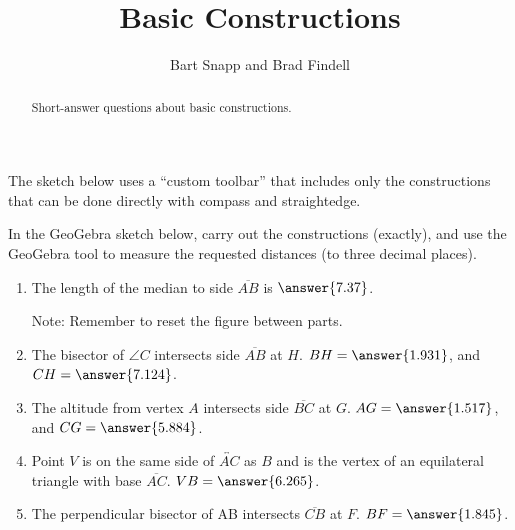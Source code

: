 \documentclass[nooutcomes]{ximera}
\title{Basic Constructions}
\author{Bart Snapp and Brad Findell}
\begin{document}
\begin{abstract}
Short-answer questions about basic constructions. 
\end{abstract}
\maketitle


\begin{warning}
The sketch below uses a ``custom toolbar'' that includes only the constructions that can be done directly with compass and straightedge.  
\end{warning}
\begin{problem}
In the GeoGebra sketch below, carry out the constructions (exactly), and use the GeoGebra tool to measure the requested distances (to three decimal places).  
\begin{center}  
\end{center}
%
\begin{enumerate}
\item The length of the median to side $\overline{AB}$ 
is $\answer{7.37}$.  

Note: Remember to reset the figure between parts.   

\item The bisector of $\angle C$ intersects side $\overline{AB}$ at $H$.  
$BH =  \answer{1.931}$, and $CH = \answer{7.124}$.  

\item The altitude from vertex $A$ intersects side $\overline{BC}$ at $G$.
$AG = \answer{1.517}$, and 
$CG = \answer{5.884}$.  

\item Point $V$ is on the same side of $\overleftrightarrow{AC}$ as $B$ and is the vertex of an equilateral triangle with base $\overline{AC}$.  
$VB = \answer{6.265}$. 

\item The perpendicular bisector of AB intersects $\overline{CB}$ at $F$.  
$BF = \answer{1.845}$.
\end{enumerate}

\end{problem}
\end{document}
